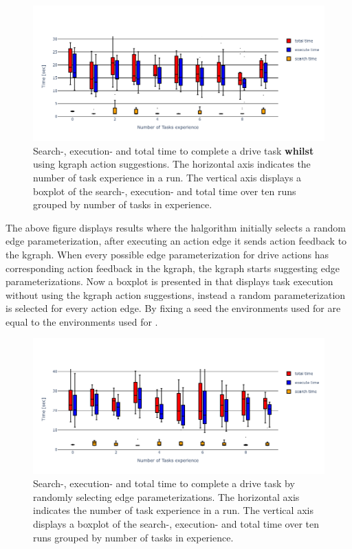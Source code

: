\begin{figure}[H]
    \centering
    \includegraphics[width=\textwidth]{figures/results/random_drive_time_kgraph}
    \caption{Search-, execution- and total time to complete a drive task \textbf{whilst} using \ac{kgraph} action suggestions. The horizontal axis indicates the number of task experience in a run. The vertical axis displays a boxplot of the search-, execution- and total time over ten runs grouped by number of tasks in experience.}%
   \label{fig:random_drive_time_kgraph}
\end{figure}

The above figure displays results where the \ac{halgorithm} initially selects a random edge parameterization, after executing an action edge it sends action feedback to the \ac{kgraph}. When every possible edge parameterization for drive actions has corresponding action feedback in the \ac{kgraph}, the \ac{kgraph} starts suggesting edge parameterizations. Now a boxplot is presented in  that displays task execution without using the \ac{kgraph} action suggestions, instead a random parameterization is selected for every action edge. By fixing a seed the environments used for  are equal to the environments used for .\bs

\begin{figure}[H]
    \centering
    \includegraphics[width=\textwidth]{figures/results/random_drive_time_no_kgraph}
    \caption{Search-, execution- and total time to complete a drive task by randomly selecting edge parameterizations. The horizontal axis indicates the number of task experience in a run. The vertical axis displays a boxplot of the search-, execution- and total time over ten runs grouped by number of tasks in experience. }%
   \label{fig:random_drive_time_no_kgraph}
\end{figure}


